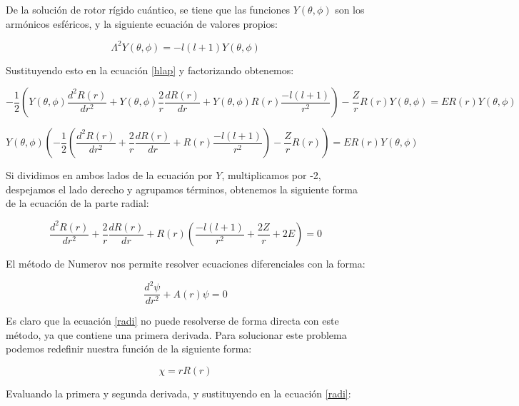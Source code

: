 \documentclass[12pt,a4paper]{report}
\begin{document}
De la solución de rotor rígido cuántico, se tiene que las funciones $Y(\theta,\phi)$ son los armónicos esféricos, y la siguiente ecuación de valores propios:

\begin{equation}\label{rot}
\Lambda^2 Y(\theta,\phi)=-l(l+1)Y(\theta,\phi)
\end{equation}
 
Sustituyendo esto en la ecuación \ref{hlap} y factorizando obtenemos:

\begin{equation}
-\frac{1}{2} \left( Y(\theta,\phi) \frac{d^2 R(r)}{d r^2} + Y(\theta,\phi) \frac{2}{r} \frac{d R(r)}{d r} + Y(\theta,\phi) R(r) \frac{-l(l+1)}{r^2} \right)  - \frac{Z}{r} R(r)Y(\theta,\phi)=E R(r)Y(\theta,\phi)
\end{equation}

\begin{equation}\label{fact}
Y(\theta,\phi)\left( - \frac{1}{2} \left( \frac{d^2 R(r)}{d r^2} + \frac{2}{r} \frac{d R(r)}{d r} + R(r) \frac{-l(l+1)}{r^2} \right) - \frac{Z}{r} R(r)\right)=E R(r)Y(\theta,\phi)
\end{equation}

Si dividimos en ambos lados de la ecuación por $Y$, multiplicamos por -2, despejamos el lado derecho y agrupamos términos, obtenemos la siguiente forma de la ecuación de la parte radial:

\begin{equation}\label{radi}
  \frac{d^2 R(r)}{d r^2} + \frac{2}{r} \frac{d R(r)}{d r} + R(r)\left( \frac{-l(l+1)}{r^2} + \frac{2Z}{r}+ 2E \right)=0
\end{equation}

El método de Numerov nos permite resolver ecuaciones diferenciales con la forma:

\begin{equation}\label{difnu}
\frac{d^2 \psi}{dr^2}+A(r)\psi =0 
\end{equation}

Es claro que la ecuación \ref{radi} no puede resolverse de forma directa con este método, ya que contiene una primera derivada. Para solucionar este problema podemos redefinir nuestra función de la siguiente forma:

\begin{equation}\label{chi}
\chi=rR(r)
\end{equation}

Evaluando la primera y segunda derivada, y sustituyendo en la ecuación \ref{radi}:
\end{document}
